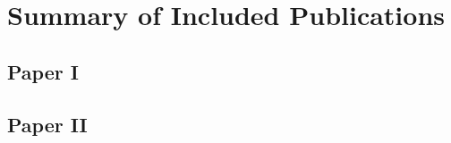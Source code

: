 \chapter{Summary of Included Publications} \label{chap:results}
\lipsum[3]

\section{Paper I}
\lipsum[1]

\section{Paper II}
\lipsum[2]